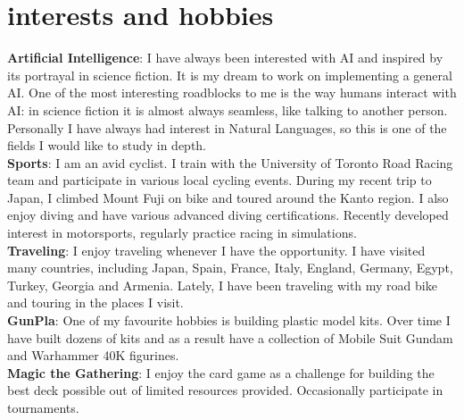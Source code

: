 \documentclass[]{cv-roald}
\begin{document}
\section*{interests and hobbies}
\textbf{Artificial Intelligence}: I have always been interested with AI and inspired by its portrayal in science fiction. It is my dream to work on implementing a general AI. One of the most interesting roadblocks to me is the way humans interact with AI: in science fiction it is almost always seamless, like talking to another person. Personally I have always had interest in Natural Languages, so this is one of the fields I would like to study in depth.\\
\textbf{Sports}: I am an avid cyclist. I train with the University of Toronto Road Racing team and participate in various local cycling events. During my recent trip to Japan, I climbed Mount Fuji on bike and toured around the Kanto region.
I also enjoy diving and have various advanced diving certifications. Recently developed interest in motorsports, regularly practice racing in simulations.\\
\textbf{Traveling}: I enjoy traveling whenever I have the opportunity. I have visited many countries, including Japan, Spain, France, Italy, England, Germany, Egypt, Turkey, Georgia and Armenia. Lately, I have been traveling with my road bike and touring in the places I visit.\\
\textbf{GunPla}: One of my favourite hobbies is building plastic model kits. Over time I have built dozens of kits and as a result have a collection of Mobile Suit Gundam and Warhammer 40K figurines.\\
\textbf{Magic the Gathering}: I enjoy the card game as a challenge for building the best deck possible out of limited resources provided. Occasionally participate in tournaments.\\
\end{document}
